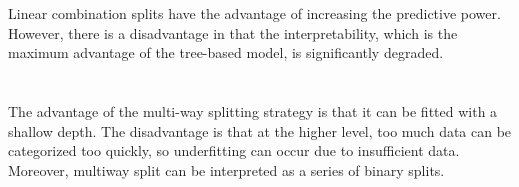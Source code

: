 \documentclass[11pt,a4paper]{article}
\begin{document}
\section{}

Linear combination splits have the advantage of increasing the predictive power. However, there is a disadvantage in that the interpretability, which is the maximum advantage of the tree-based model, is significantly degraded.

\section{}

The advantage of the multi-way splitting strategy is that it can be fitted with a shallow depth. The disadvantage is that at the higher level, too much data can be categorized too quickly, so underfitting can occur due to insufficient data. Moreover, multiway split can be interpreted as a series of binary splits.
\end{document}
